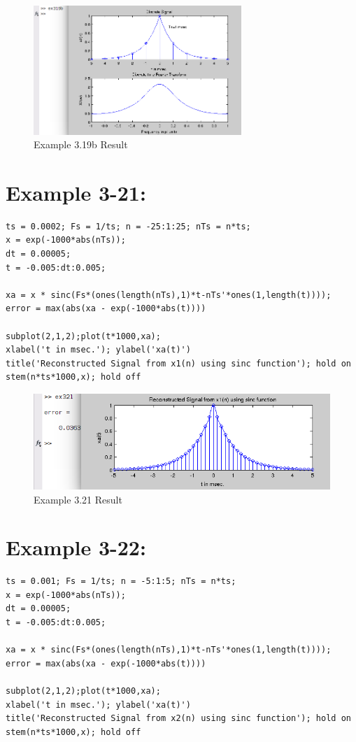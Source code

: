 \documentclass[11pt
  , a4paper
  , article
  , oneside
]{memoir}
\begin{document}
\begin{figure}[h!]
	\centering
	\includegraphics[width=0.7\textwidth,height=0.35\textwidth]{./images/ex319b.png}
	\caption{Example 3.19b Result}
	\label{fig:Example 3-19b Result}
\end{figure}

\chapter{Example 3-21:}
\begin{lstlisting}[style=termstyle]
% Example 3.21
ts = 0.0002; Fs = 1/ts; n = -25:1:25; nTs = n*ts;
x = exp(-1000*abs(nTs));
dt = 0.00005;
t = -0.005:dt:0.005;

xa = x * sinc(Fs*(ones(length(nTs),1)*t-nTs'*ones(1,length(t))));
error = max(abs(xa - exp(-1000*abs(t))))

subplot(2,1,2);plot(t*1000,xa);
xlabel('t in msec.'); ylabel('xa(t)')
title('Reconstructed Signal from x1(n) using sinc function'); hold on
stem(n*ts*1000,x); hold off
\end{lstlisting}

\clearpage

\begin{figure}[h!]
	\centering
	\includegraphics{./images/ex321.png}
	\caption{Example 3.21 Result}
	\label{fig:Example 3-21 Result}
\end{figure}

\chapter{Example 3-22:}
\begin{lstlisting}[style=termstyle]
% Example 3.22
ts = 0.001; Fs = 1/ts; n = -5:1:5; nTs = n*ts;
x = exp(-1000*abs(nTs));
dt = 0.00005;
t = -0.005:dt:0.005;

xa = x * sinc(Fs*(ones(length(nTs),1)*t-nTs'*ones(1,length(t))));
error = max(abs(xa - exp(-1000*abs(t))))

subplot(2,1,2);plot(t*1000,xa);
xlabel('t in msec.'); ylabel('xa(t)')
title('Reconstructed Signal from x2(n) using sinc function'); hold on
stem(n*ts*1000,x); hold off  
\end{lstlisting}
\end{document}

